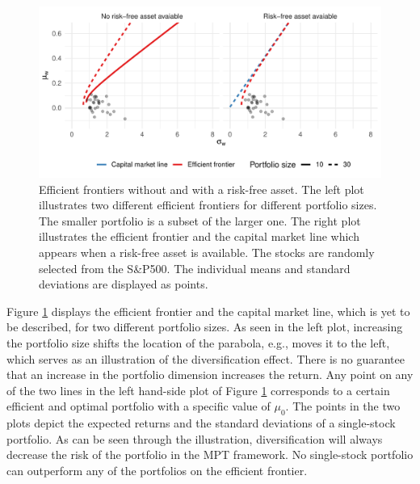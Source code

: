 \documentclass[12pt, oneside]{book}\usepackage{knitr}
\begin{document}
\begin{knitrout}\small
{}\color{fgcolor}\begin{figure}

{\centering \includegraphics[width=\maxwidth]{figure/mertons_efficient_frontier-1} 

}

\caption[Efficient frontiers without and with a risk-free asset]{Efficient frontiers without and with a risk-free asset. The left plot illustrates two different efficient frontiers for different portfolio sizes. The smaller portfolio is a subset of the larger one. The right plot illustrates the efficient frontier and the capital market line which appears when a risk-free asset is available. The stocks are randomly selected from the S\&P500. The individual means and standard deviations are displayed as points.}\label{fig:mertons_efficient_frontier}
\end{figure}

\end{knitrout}
Figure \ref{fig:mertons_efficient_frontier} displays the efficient frontier and the capital market line, which is yet to be described, for two different portfolio sizes. 
As seen in the left plot, increasing the portfolio size shifts the location of the parabola, e.g., moves it to the left, which serves as an illustration of the diversification effect. 
There is no guarantee that an increase in the portfolio dimension increases the return.
Any point on any of the two lines in the left hand-side plot of Figure \ref{fig:mertons_efficient_frontier} corresponds to a certain efficient and optimal portfolio with a specific value of $\mu_0$. 
The points in the two plots depict the expected returns and the standard deviations of a single-stock portfolio. 
As can be seen through the illustration, diversification will always decrease the risk of the portfolio in the MPT framework. 
No single-stock portfolio can outperform any of the portfolios on the efficient frontier. 
\end{document}
